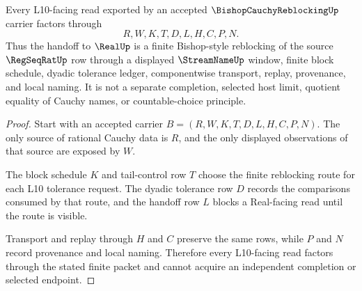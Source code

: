 \begin{theorem}
\label{thm:bishop-cauchy-reblocking-l10-handoff}
Every L10-facing read exported by an accepted $\BishopCauchyReblockingUp$ carrier factors through
$$
R,W,K,T,D,L,H,C,P,N .
$$
Thus the handoff to $\RealUp$ is a finite Bishop-style reblocking of the source $\RegSeqRatUp$ row through a displayed $\StreamNameUp$ window, finite block schedule, dyadic tolerance ledger, componentwise transport, replay, provenance, and local naming. It is not a separate completion, selected host limit, quotient equality of Cauchy names, or countable-choice principle.
\end{theorem}
\begin{proof}
Start with an accepted carrier $B=(R,W,K,T,D,L,H,C,P,N)$. The only source of rational Cauchy data is $R$, and the only displayed observations of that source are exposed by $W$.

The block schedule $K$ and tail-control row $T$ choose the finite reblocking route for each L10 tolerance request. The dyadic tolerance row $D$ records the comparisons consumed by that route, and the handoff row $L$ blocks a Real-facing read until the route is visible.

Transport and replay through $H$ and $C$ preserve the same rows, while $P$ and $N$ record provenance and local naming. Therefore every L10-facing read factors through the stated finite packet and cannot acquire an independent completion or selected endpoint.
\end{proof}




